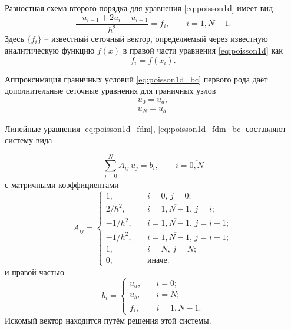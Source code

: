 Разностная схема второго порядка для уравнения \eqref{eq:poisson1d} имеет вид
\begin{equation}
    \label{eq:poisson1d_fdm}
    \frac{-u_{i-1} + 2u_{i} - u_{i+1}}{h^2} = f_i, \qquad i=\overline{1,N-1}.
\end{equation}
Здесь $\{f_i\}$ -- известный сеточный вектор, определяемый через известную
аналитическую функцию $f(x)$ в правой части уравнения \eqref{eq:poisson1d} как
\begin{equation}
    \label{eq:poisson1d_fdm2}
    f_i = f(x_i).
\end{equation}

Аппроксимация граничных условий \eqref{eq:poisson1d_bc} первого рода даёт дополнительные 
сеточные уравнения для граничных узлов
\begin{equation}
    \label{eq:poisson1d_fdm_bc}
    \begin{array}{ll}
        u_0 = u_a,\\
        u_N = u_b
    \end{array}
\end{equation}

Линейные уравнения \eqref{eq:poisson1d_fdm}, \eqref{eq:poisson1d_fdm_bc}
составляют систему вида

\begin{equation*}
    \sum_{j=0}^{N} A_{ij}\,u_j = b_i, \qquad i=\overline{0,N}
\end{equation*}
с матричными коэффициентами
\begin{equation}
    \label{eq:poisson1d_fdm_lhs}
    A_{ij} = \begin{cases}
        1,      &\quad i=0, \, j=0; \\
        2/h^2,  &\quad i=\overline{1,N-1}, \, j=i;\\
        -1/h^2, &\quad i=\overline{1,N-1}, \, j=i-1;\\
        -1/h^2, &\quad i=\overline{1,N-1}, \, j=i+1;\\
        1,      &\quad i=N, \, j=N; \\
        0,      &\quad \text{иначе}.
    \end{cases}
\end{equation}
и правой частью
\begin{equation}
    \label{eq:poisson1d_fdm_rhs}
    b_i = \begin{cases}
        u_a,   &\quad i=0;\\
        u_b,   &\quad i=N;\\
        f_i,   &\quad i=\overline{1,N-1}.
    \end{cases}
\end{equation}
Искомый вектор находится путём решения этой системы.

